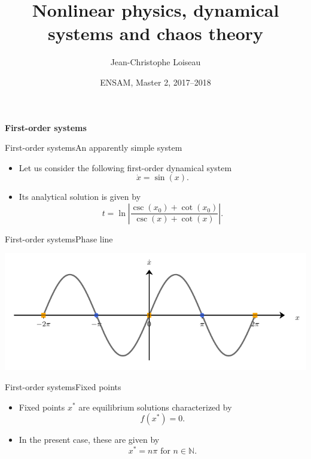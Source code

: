 \documentclass[usenames,dvipsnames,svgnames,10pt,aspectratio=169]{beamer}
\title[Nonlinear Physics] %
{
	Nonlinear physics, dynamical \\ systems and chaos theory
}
\author[J.-Ch.~Loiseau] %
{
	Jean-Christophe Loiseau
}
\institute[unused]
{
	\url{jean-christophe.loiseau@ensam.eu} \\
	DynFluid, \\
	Arts et M\'etiers ParisTech, France
}
\date[unused]{ENSAM, Master 2, 2017--2018}
\begin{document}
\titleframe %


\begin{frame}[t, c]{}
	\centering
	\vspace{1cm}

	{\Large \textbf{First-order systems}}

	\bigskip

	{}

\end{frame}

\begin{frame}[t, c]{First-order systems}{An apparently simple system}
	\begin{itemize}
		\item Let us consider the following first-order dynamical system
		$$
		\dot{x} = \sin(x).
		$$

		\bigskip

		\item Its analytical solution is given by
		$$
		t = \displaystyle \ln \left\vert \frac{\csc(x_0) + \cot(x_0)}{\csc(x) + \cot(x)} \right\vert.
		$$
	\end{itemize}

	\vspace{1cm}
\end{frame}

\begin{frame}[t, c]{First-order systems}{Phase line}
	\centering

	\includegraphics[width=.75\textwidth]{flow_on_the_line}

	\vspace{1cm}
\end{frame}

\begin{frame}[t, c]{First-order systems}{Fixed points}
	\begin{itemize}
		\item Fixed points $x^*$ are equilibrium solutions characterized by
		$$
		f(x^*) = 0.
		$$

		\bigskip

		\item In the present case, these are given by
		$$
		x^* = n \pi \text{ for } n \in \mathbb{N}.
		$$
	\end{itemize}

	\vspace{1cm}
\end{frame}
\end{document}
